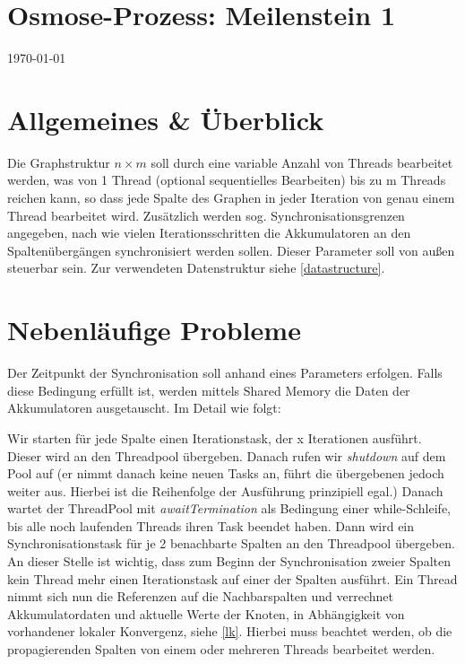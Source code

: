 
\usepackage{pdfpages}
\usepackage{listings}



\newcommand{\subttl}{\textbf{Milestone 1}}
\newcommand{\StudNameOne}{Christoph Rosenhauer (2549220)}
\newcommand{\StudNameTwo}{Lukas Schaal (2539218)}
\newcommand{\StudNameThree}{Jens Heinen (2542182)}


\section*{\centering Osmose-Prozess: Meilenstein 1}
\today

\section{Allgemeines \& Überblick}
Die Graphstruktur $n \times m$ soll durch eine variable Anzahl von Threads bearbeitet werden, was von 1 Thread (optional sequentielles Bearbeiten) bis zu m Threads reichen kann, so dass jede Spalte des Graphen in jeder Iteration von genau einem Thread bearbeitet wird. 
Zusätzlich werden sog. Synchronisationsgrenzen  angegeben, nach wie vielen Iterationsschritten die Akkumulatoren an den Spaltenübergängen synchronisiert werden sollen. Dieser Parameter soll von außen steuerbar sein. Zur verwendeten Datenstruktur siehe \ref{datastructure}.

\section{Nebenläufige Probleme}
Der Zeitpunkt der Synchronisation soll anhand eines Parameters erfolgen. Falls diese Bedingung erfüllt ist, werden mittels Shared Memory die Daten der Akkumulatoren ausgetauscht. Im Detail wie folgt:

Wir starten für jede Spalte einen Iterationstask, der x Iterationen ausführt. Dieser wird an den Threadpool übergeben. Danach rufen wir \textit{shutdown}  auf dem Pool auf (er nimmt danach keine neuen Tasks an, führt die übergebenen jedoch weiter aus. Hierbei ist die Reihenfolge der Ausführung prinzipiell egal.) Danach wartet der ThreadPool mit \textit{awaitTermination} als Bedingung einer while-Schleife, bis alle noch laufenden Threads ihren Task beendet haben.
Dann wird ein Synchronisationstask für je 2 benachbarte Spalten an den Threadpool übergeben. An dieser Stelle ist wichtig, dass zum Beginn der Synchronisation zweier Spalten kein Thread mehr einen Iterationstask auf einer der Spalten ausführt. Ein Thread nimmt sich nun die Referenzen auf die Nachbarspalten und verrechnet Akkumulatordaten und aktuelle Werte der Knoten, in Abhängigkeit von vorhandener lokaler Konvergenz, siehe \ref{lk}. Hierbei muss beachtet werden, ob die propagierenden Spalten von einem oder mehreren Threads bearbeitet werden.

